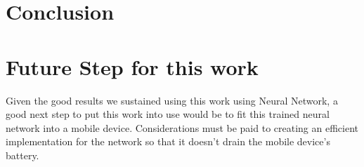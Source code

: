 \documentclass{article}
\begin{document}
\section {Conclusion}
\label{conclusion}

\section{Future Step for this work}
Given the good results we sustained using this work using Neural Network, a good next step to put this work into use would be to fit this 
trained neural network into a mobile device. Considerations must be paid to creating an efficient implementation for the network so that 
it doesn't drain the mobile device's battery.
{}

\end{document}
